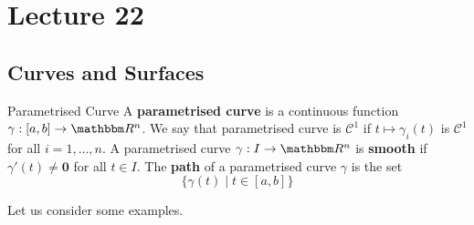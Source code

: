 \documentclass[../Analysis-3]{subfiles}
\begin{document}
\chapter*{Lecture 22} %
\setcounter{chapter}{22} %
\setcounter{section}{0}

\section{Curves and Surfaces}

\begin{Def}{Parametrised Curve}{} 
    A \textbf{parametrised curve} is a continuous function $\gamma : [a,b] \to \R^n$. We say that parametrised curve is $\mathscr{C}^1$ if $t \mapsto \gamma_i(t)$ is $\mathscr{C}^1$ for all $i = 1,\dots,n$. A parametrised curve $\gamma : I \to \R^n$ is \textbf{smooth} if $\gamma'(t) \neq \mathbf{0}$ for all $t \in I$. The \textbf{path} of a parametrised curve $\gamma$ is the set 
    \[
        \{ \gamma(t) \mid t \in [a,b] \}    
    \] 
\end{Def}

Let us consider some examples. 
\end{document}
